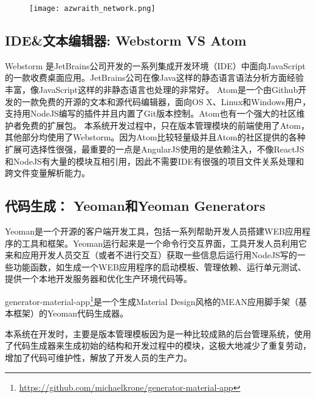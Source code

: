 \begin{figure}[!htp]
 \centering
 \texttt{[image: azwraith\_network.png]}
\end{figure}

\subsection{IDE&文本编辑器: Webstorm VS Atom}
Webstorm 是JetBrains公司开发的一系列集成开发环境（IDE）中面向JavaScript的一款收费桌面应用。JetBrains公司在像Java这样的静态语言语法分析方面经验丰富，像JavaScript这样的非静态语言也处理的非常好。
Atom是一个由Github开发的一款免费的开源的文本和源代码编辑器，面向OS X、Linux和Windows用户，支持用NodeJS编写的插件并且内置了Git版本控制。Atom也有一个强大的社区维护者免费的扩展包。
本系统开发过程中，只在版本管理模块的前端使用了Atom，其他部分均使用了Webstorm。因为Atom比较轻量级并且Atom的社区提供的各种扩展可选择性很强，最重要的一点是AngularJS使用的是依赖注入，不像ReactJS和NodeJS有大量的模块互相引用，因此不需要IDE有很强的项目文件关系处理和跨文件变量解析能力。

\subsection{代码生成： Yeoman和Yeoman Generators}
Yeoman是一个开源的客户端开发工具，包括一系列帮助开发人员搭建WEB应用程序的工具和框架。Yeoman运行起来是一个命令行交互界面，工具开发人员利用它来和应用开发人员交互（或者不进行交互）获取一些信息后运行用NodeJS写的一些功能函数，如生成一个WEB应用程序的启动模板、管理依赖、运行单元测试、提供一个本地开发服务器和优化生产环境代码等。

generator-material-app\footnote{\url{https://github.com/michaelkrone/generator-material-app}}是一个生成Material Design风格的MEAN应用脚手架（基本框架）的Yeoman代码生成器。

本系统在开发时，主要是版本管理模板因为是一种比较成熟的后台管理系统，使用了代码生成器来生成初始的结构和开发过程中的模块，这极大地减少了重复劳动，增加了代码可维护性，解放了开发人员的生产力。


